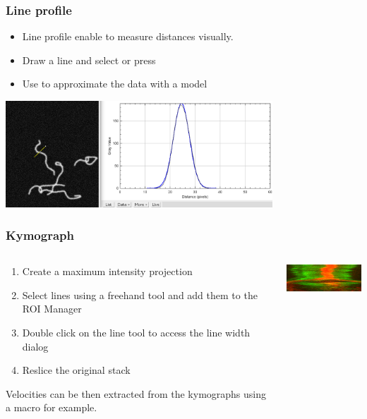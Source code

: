 \documentclass[ignorenonframetext,aspectratio=169,10pt,xcolor=table]{beamer}
\begin{document}
\begin{frame} \frametitle{Line profile}
  \begin{itemize}
  \item Line profile enable to measure distances visually.
  \item Draw a line and select  or press
  \item Use  to approximate the data with a model
  \end{itemize}
  \begin{center}
    \includegraphics[width=0.75\textwidth]{line-profile}
  \end{center}
\end{frame}

\begin{frame} \frametitle{Kymograph}
  \begin{columns}
    \begin{column}{0.5\textwidth}
      \begin{enumerate}
      \item Create a maximum intensity projection
      \item Select lines using a freehand tool and add them to the ROI
        Manager
      \item Double click on the line tool to access the line width
        dialog
      \item Reslice the original stack
      \end{enumerate} Velocities can be then extracted from the
      kymographs using a macro for example.
    \end{column}
    \begin{column}{0.5\textwidth}
      \includegraphics[width=\textwidth]{kymo_mito}
    \end{column}
  \end{columns}
\end{frame}
\end{document}
